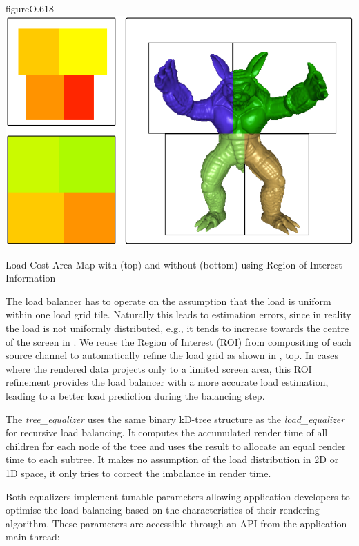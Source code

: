 \begin{wrapfloat}{figure}{O}{.618\textwidth}
  \includegraphics[width=.618\textwidth]{images/roi}
  \caption{Load Cost Area Map with (top) and without (bottom) using Region of Interest Information}
  \label{fROI}
\end{wrapfloat}

The load balancer has to operate on the assumption that the load is uniform
within one load grid tile. Naturally this leads to estimation errors, since in
reality the load is not uniformly distributed, e.g., it tends to increase
towards the centre of the screen in . We reuse the Region of Interest
(ROI) from compositing of each source channel to automatically refine the load
grid as shown in , top. In cases where the rendered data projects only
to a limited screen area, this ROI refinement provides the load balancer with a
more accurate load estimation, leading to a better load prediction during the
balancing step.

The {\em tree\_equalizer} uses the same binary kD-tree structure as the
{\em load\_equalizer} for recursive load balancing. It computes the
accumulated render time of all children for each node of the tree and uses
the result to allocate an equal render time to each subtree. It makes no assumption
of the load distribution in 2D or 1D space, it only tries to correct the
imbalance in render time.

Both equalizers implement tunable parameters allowing application developers
to optimise the load balancing based on the characteristics of their rendering
algorithm. These parameters are accessible through an API from the application
main thread:

